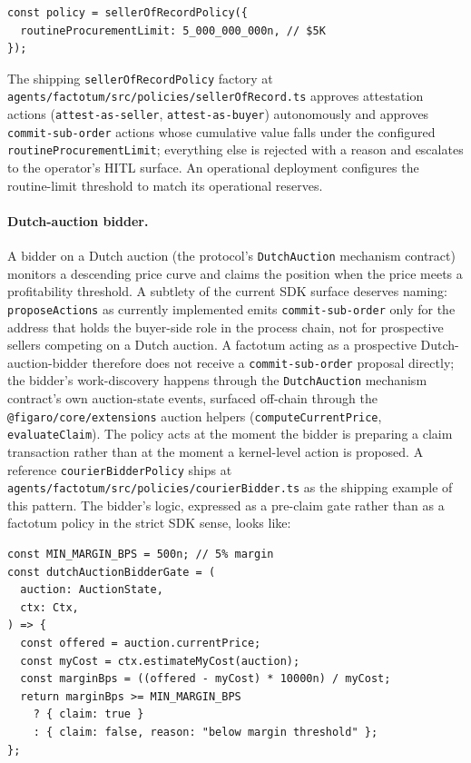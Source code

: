 \documentclass[11pt,a4paper]{article}
\theoremstyle{definition}
\theoremstyle{remark}
\begin{document}
\begin{lstlisting}
const policy = sellerOfRecordPolicy({
  routineProcurementLimit: 5_000_000_000n, // $5K
});
\end{lstlisting}

\noindent
The shipping \texttt{sellerOfRecordPolicy} factory at
\texttt{agents/factotum/src/policies/sellerOfRecord.ts} approves
attestation actions (\texttt{attest-as-seller},
\texttt{attest-as-buyer}) autonomously and approves
\texttt{commit-sub-order} actions whose cumulative value falls
under the configured \texttt{routineProcurementLimit}; everything
else is rejected with a reason and escalates to the operator's
HITL surface. An operational deployment configures the routine-limit
threshold to match its operational reserves.

\paragraph{Dutch-auction bidder.}
A bidder on a Dutch auction (the protocol's
\texttt{DutchAuction} mechanism contract) monitors a descending
price curve and claims the position when the price meets a
profitability threshold. A subtlety of the current SDK surface
deserves naming: \texttt{proposeActions} as currently implemented
emits \texttt{commit-sub-order} only for the address that holds
the buyer-side role in the process chain, not for prospective
sellers competing on a Dutch auction. A factotum acting as a
prospective Dutch-auction-bidder therefore does not receive a
\texttt{commit-sub-order} proposal directly; the bidder's
work-discovery happens through the \texttt{DutchAuction} mechanism
contract's own auction-state events, surfaced off-chain through
the \texttt{@figaro/core/extensions} auction helpers
(\texttt{computeCurrentPrice}, \texttt{evaluateClaim}). The
policy acts at the moment the bidder is preparing a claim
transaction rather than at the moment a kernel-level action is
proposed. A reference \texttt{courierBidderPolicy} ships at
\texttt{agents/factotum/src/policies/courierBidder.ts} as the
shipping example of this pattern. The bidder's logic, expressed
as a pre-claim gate rather than as a factotum policy in the
strict SDK sense, looks like:

\begin{lstlisting}
const MIN_MARGIN_BPS = 500n; // 5% margin
const dutchAuctionBidderGate = (
  auction: AuctionState,
  ctx: Ctx,
) => {
  const offered = auction.currentPrice;
  const myCost = ctx.estimateMyCost(auction);
  const marginBps = ((offered - myCost) * 10000n) / myCost;
  return marginBps >= MIN_MARGIN_BPS
    ? { claim: true }
    : { claim: false, reason: "below margin threshold" };
};
\end{lstlisting}
\end{document}
